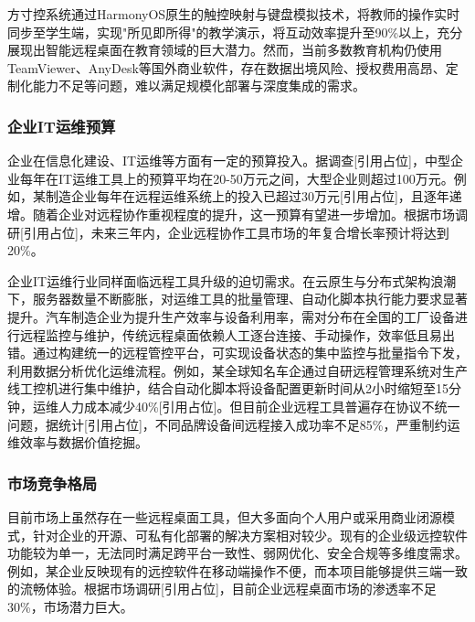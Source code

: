 \documentclass[12pt,a4paper]{article}
\renewcommand{\cite}[1]{[引用占位]}
\begin{document}
方寸控系统通过HarmonyOS原生的触控映射与键盘模拟技术，将教师的操作实时同步至学生端，实现"所见即所得"的教学演示，将互动效率提升至90\%以上，充分展现出智能远程桌面在教育领域的巨大潜力。然而，当前多数教育机构仍使用TeamViewer、AnyDesk等国外商业软件，存在数据出境风险、授权费用高昂、定制化能力不足等问题，难以满足规模化部署与深度集成的需求。

\subsubsection{企业IT运维预算}

企业在信息化建设、IT运维等方面有一定的预算投入。据调查\cite{survey2023budget}，中型企业每年在IT运维工具上的预算平均在20-50万元之间，大型企业则超过100万元。例如，某制造企业每年在远程运维系统上的投入已超过30万元\cite{case2022manufacturing}，且逐年递增。随着企业对远程协作重视程度的提升，这一预算有望进一步增加。根据市场调研\cite{idc2023growth}，未来三年内，企业远程协作工具市场的年复合增长率预计将达到20\%。

企业IT运维行业同样面临远程工具升级的迫切需求。在云原生与分布式架构浪潮下，服务器数量不断膨胀，对运维工具的批量管理、自动化脚本执行能力要求显著提升。汽车制造企业为提升生产效率与设备利用率，需对分布在全国的工厂设备进行远程监控与维护，传统远程桌面依赖人工逐台连接、手动操作，效率低且易出错。通过构建统一的远程管控平台，可实现设备状态的集中监控与批量指令下发，利用数据分析优化运维流程。例如，某全球知名车企通过自研远程管理系统对生产线工控机进行集中维护，结合自动化脚本将设备配置更新时间从2小时缩短至15分钟，运维人力成本减少40\%\cite{case2023automotive}。但目前企业远程工具普遍存在协议不统一问题，据统计\cite{test2023compatibility}，不同品牌设备间远程接入成功率不足85\%，严重制约运维效率与数据价值挖掘。

\subsubsection{市场竞争格局}
目前市场上虽然存在一些远程桌面工具，但大多面向个人用户或采用商业闭源模式，针对企业的开源、可私有化部署的解决方案相对较少。现有的企业级远控软件功能较为单一，无法同时满足跨平台一致性、弱网优化、安全合规等多维度需求。例如，某企业反映现有的远控软件在移动端操作不便，而本项目能够提供三端一致的流畅体验。根据市场调研\cite{market2023penetration}，目前企业远程桌面市场的渗透率不足30\%，市场潜力巨大。
\end{document}
